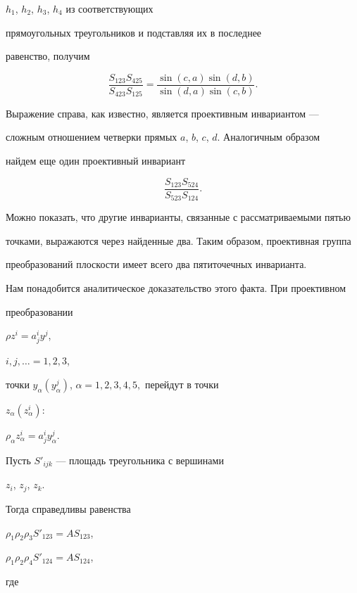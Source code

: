 $h_{1}$, $h_{2}$, $h_{3}$, $h_{4}$ из соответствующих


прямоугольных треугольников и подставляя их в последнее


равенство, получим


$$


\frac{S_{123}S_{425}}{S_{423}S_{125}}=


\frac{\sin(c,a) \sin(d,b)}{\sin(d,a) \sin(c,b)}.


$$





Выражение справа, как известно, является проективным инвариантом ---


сложным отношением четверки прямых $a$, $b$, $c$, $d$. Аналогичным образом


найдем еще один проективный инвариант


$$


\frac{S_{123}S_{524}}{S_{523}S_{124}}.


$$


Можно показать, что другие инварианты, связанные с рассматриваемыми пятью


точками, выражаются через найденные два. Таким образом, проективная группа


преобразований плоскости имеет всего два пятиточечных инварианта.





Нам понадобится аналитическое доказательство этого факта. При проективном


преобразовании


$\rho z^{i}=a^{i}_{j}y^{j}$, 


$i, j,\dotsc=1, 2, 3$,


точки $y_{\alpha}(y^{j}_{\alpha})$, $\alpha=1, 2, 3, 4, 5,$ перейдут в точки


$z_{\alpha}(z^{i}_{\alpha})$:


$\rho_{\alpha} z^{i}_{\alpha}=a^{i}_{j}y^{j}_{\alpha}$.





Пусть $S'_{ijk}$ --- площадь треугольника с вершинами


$z_i$, $z_j$, $z_k$.


Тогда справедливы равенства


$\rho_{1} \rho_{2} \rho_{3} S'_{123}=A S_{123}$,


$\rho_{1} \rho_{2} \rho_{4} S'_{124}=A S_{124}$,


где



